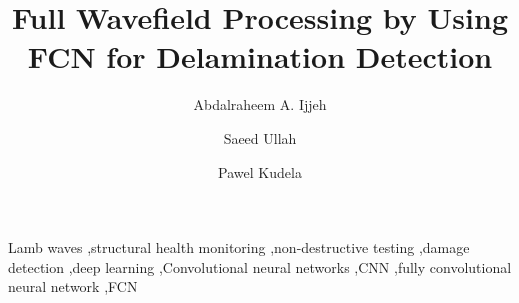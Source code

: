 \documentclass[preprint,9pt]{elsarticle}
\begin{document}
	\begin{frontmatter}
		
		\title{Full Wavefield Processing by Using FCN for Delamination Detection}
		
		\address[IFFM]{Institute of Fluid Flow Machinery, Polish Academy of Sciences, Poland}
		
		\author{Abdalraheem A. Ijjeh}
		\author{Saeed Ullah }
		\author{Pawel Kudela}
		
		
		\begin{abstract}
		
		\end{abstract}
		
		\begin{keyword}
			Lamb waves \sep structural health monitoring \sep non-destructive testing \sep damage detection \sep deep learning \sep Convolutional neural networks \sep CNN \sep fully convolutional neural network \sep FCN
			
			
		\end{keyword}
		
	\end{frontmatter}

\end{document}

